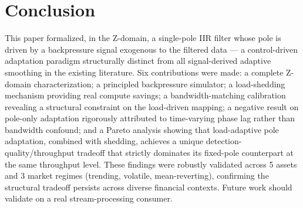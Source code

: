 \documentclass[conference]{IEEEtran}
\begin{document}
\section{Conclusion}

This paper formalized, in the Z-domain, a single-pole IIR filter whose pole
is driven by a backpressure signal exogenous to the filtered data — a
control-driven adaptation paradigm structurally distinct from all
signal-derived adaptive smoothing in the existing literature. Six
contributions were made: a complete Z-domain characterization; a principled
backpressure simulator; a load-shedding mechanism providing real compute
savings; a bandwidth-matching calibration revealing a structural constraint on
the load-driven mapping; a negative result on pole-only adaptation rigorously
attributed to time-varying phase lag rather than bandwidth confound; and a
Pareto analysis showing that load-adaptive pole adaptation, combined with
shedding, achieves a unique detection-quality/throughput tradeoff that strictly
dominates its fixed-pole counterpart at the same throughput level. 
These findings were robustly validated across 5 assets and 3 market regimes (trending, volatile, mean-reverting), confirming the structural tradeoff persists across diverse financial contexts. Future work
should validate on a real stream-processing consumer.
\end{document}
